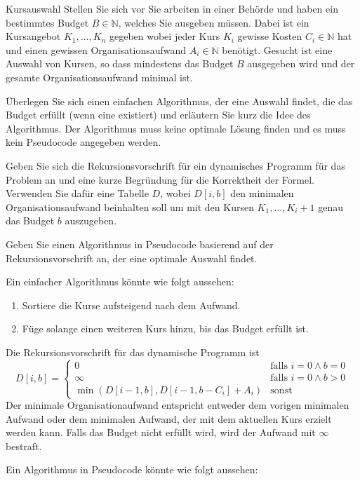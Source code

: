 \documentclass{article}
\begin{document}
\begin{eexercises}{Kursauswahl}{
    Stellen Sie sich vor Sie arbeiten in einer Behörde und haben ein bestimmtes Budget $B \in \mathbb{N}$, welches Sie ausgeben müssen. Dabei ist ein Kursangebot $K_1, \ldots, K_n$ gegeben wobei jeder Kurs $K_i$ gewisse Kosten $C_i \in \mathbb{N}$ hat und einen gewissen Organisationsaufwand $A_i \in \mathbb{N}$ benötigt. Gesucht ist eine Auswahl von Kursen, so dass mindestens das Budget $B$ ausgegeben wird und der gesamte Organisationsaufwand minimal ist.
  }
  \item Überlegen Sie sich einen einfachen Algorithmus, der eine Auswahl findet, die das Budget erfüllt (wenn eine existiert) und erläutern Sie kurz die Idee des Algorithmus. Der Algorithmus muss keine optimale Lösung finden und es muss kein Pseudocode angegeben werden.
  \item Geben Sie sich die Rekursionsvorschrift für ein dynamisches Programm für das Problem an und eine kurze Begründung für die Korrektheit der Formel. Verwenden Sie dafür eine Tabelle $D$, wobei $D[i, b]$ den minimalen Organisationsaufwand beinhalten soll um mit den Kursen $K_1, \ldots, K_i+1$ genau das Budget $b$ auszugeben.
  \item Geben Sie einen Algorithmus in Pseudocode basierend auf der Rekursionsvorschrift an, der eine optimale Auswahl findet.
\end{eexercises}

\begin{solutions}
  \item Ein einfacher Algorithmus könnte wie folgt aussehen:
  \begin{enumerate}
    \item Sortiere die Kurse aufsteigend nach dem Aufwand.
    \item Füge solange einen weiteren Kurs hinzu, bis das Budget erfüllt ist.
  \end{enumerate}
  \item Die Rekursionsvorschrift für das dynamische Programm ist\[
    D[i, b] = \begin{cases}
      0                                  & \text{falls } i=0 \land b=0 \\
      \infty                             & \text{falls } i=0 \land b>0 \\
      \min(D[i-1, b], D[i-1, b-C_i]+A_i) & \text{sonst}
    \end{cases}
  \] Der minimale Organisationaufwand entspricht entweder dem vorigen minimalen Aufwand oder dem minimalen Aufwand, der mit dem aktuellen Kurs erzielt werden kann. Falls das Budget nicht erfüllt wird, wird der Aufwand mit $\infty$ bestraft.
  \item Ein Algorithmus in Pseudocode könnte wie folgt aussehen:\par

\end{solutions}
\end{document}

